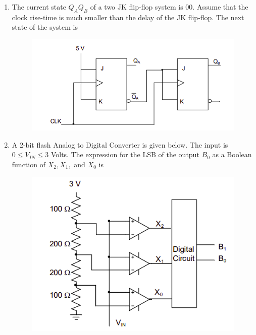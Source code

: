 \documentclass[journal,12pt,onecolumn]{IEEEtran}
\theoremstyle{remark}
\begin{document}
\begin{enumerate}[start=1, label=Q.\arabic*]
    \hfill{}

    \item The current state $Q_A Q_B$ of a two JK flip-flop system is $00$. Assume that the clock rise-time is much smaller than the delay of the JK flip-flop. The next state of the system is
    \begin{figure}[H]
        \includegraphics[width=0.5\columnwidth]{Figures/q36.png}
        \centering
        \caption{}
    \end{figure}
    \begin{enumerate}
    \end{enumerate}

    \hfill{}

    \item A 2-bit flash Analog to Digital Converter  is given below. The input is $0 \leq V_{IN} \leq 3$ Volts. The expression for the LSB of the output $B_0$ as a Boolean function of $X_2, X_1,$ and $X_0$ is
    \begin{figure}[H]
        \includegraphics[width=0.6\columnwidth]{Figures/q37.png}
        \centering
        \caption{}
    \end{figure}
    \begin{enumerate}
    \end{enumerate}


\end{enumerate}
\end{document}
